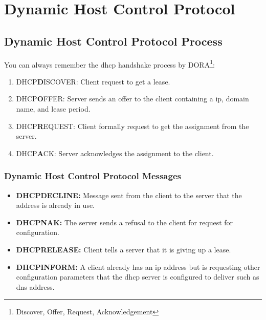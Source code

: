 
\chapter[DHCP]{Dynamic Host Control Protocol}

\section[DHCP Process]{Dynamic Host Control Protocol Process}

You can always remember the \gls{dhcp} handshake process by DORA\footnote{Discover, Offer, Request, Acknowledgement}:
\begin{enumerate}
    \item DHCP\textbf{D}ISCOVER: Client request to get a lease.
    \item DHCP\textbf{O}FFER: Server sends an offer to the client containing a \gls{ip}, domain name, and lease period.
    \item DHCP\textbf{R}EQUEST: Client formally request to get the assignment from the server.
    \item DHCP\textbf{A}CK: Server acknowledges the assignment to the client.
\end{enumerate}


\subsection[DHCP Messages]{Dynamic Host Control Protocol Messages}

\begin{itemize}
    \item \textbf{DHCPDECLINE:} Message sent from the client to the server that the address is already in use.
    \item \textbf{DHCPNAK:} The server sends a refusal to the client for request for configuration.
    \item \textbf{DHCPRELEASE:} Client tells a server that it is giving up a lease.
    \item \textbf{DHCPINFORM:} A client already has an \gls{ip} address but is requesting other configuration parameters that the \gls{dhcp} server is configured to deliver such as \gls{dns} address.
\end{itemize}

